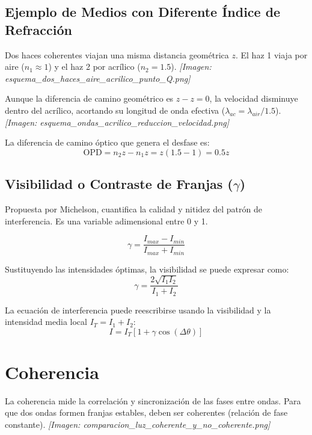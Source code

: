 \documentclass[12pt]{article}
\begin{document}
	\subsection{Ejemplo de Medios con Diferente Índice de Refracción}
	Dos haces coherentes viajan una misma distancia geométrica $z$. El haz 1 viaja por aire ($n_1 \approx 1$) y el haz 2 por acrílico ($n_2 = 1.5$).
	\textit{[Imagen: esquema\_dos\_haces\_aire\_acrilico\_punto\_Q.png]}
	
	Aunque la diferencia de camino geométrico es $z - z = 0$, la velocidad disminuye dentro del acrílico, acortando su longitud de onda efectiva ($\lambda_{ac} = \lambda_{air}/1.5$).
	\textit{[Imagen: esquema\_ondas\_acrilico\_reduccion\_velocidad.png]}
	
	La diferencia de camino óptico que genera el desfase es:
	\begin{equation*}
		\text{OPD} = n_2 z - n_1 z = z(1.5 - 1) = 0.5z
	\end{equation*}
	
	\subsection{Visibilidad o Contraste de Franjas ($\gamma$)}
	Propuesta por Michelson, cuantifica la calidad y nitidez del patrón de interferencia. Es una variable adimensional entre 0 y 1.
	
	\begin{equation*}
		\gamma = \frac{I_{max} - I_{min}}{I_{max} + I_{min}}
	\end{equation*}
	
	Sustituyendo las intensidades óptimas, la visibilidad se puede expresar como:
	\begin{equation*}
		\gamma = \frac{2\sqrt{I_1 I_2}}{I_1 + I_2}
	\end{equation*}
	
	La ecuación de interferencia puede reescribirse usando la visibilidad y la intensidad media local $I_T = I_1+I_2$:
	\begin{equation*}
		I = I_T [1 + \gamma \cos(\Delta\theta)]
	\end{equation*}
	
	\section{Coherencia}
	La coherencia mide la correlación y sincronización de las fases entre ondas. Para que dos ondas formen franjas estables, deben ser coherentes (relación de fase constante).
	\textit{[Imagen: comparacion\_luz\_coherente\_y\_no\_coherente.png]}
	
\end{document}
